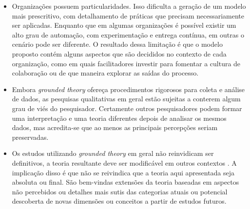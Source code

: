 \begin{itemize}
\item Organizações possuem particularidades. Isso dificulta a geração de um
modelo mais prescritivo, com detalhamento de práticas que precisam
necessariamente ser aplicadas. Enquanto que em algumas organizações é possível
existir um alto grau de automação, com experimentação e entrega contínua, em
outras o cenário pode ser diferente. O resultado dessa limitação é que o modelo
proposto contém alguns aspectos que são decididos no contexto de cada
organização, como em quais facilitadores investir para fomentar a cultura de
colaboração ou de que maneira explorar as saídas do processo.

\item Embora {\it grounded theory} ofereça procedimentos rigorosos para coleta e
análise de dados, as pesquisas qualitativas em geral estão sujeitas a conterem
algum grau de viés do pesquisador. Certamente outros pesquisadores podem formar
uma interpretação e uma teoria diferentes depois de analisar os mesmos dados,
mas acredita-se que ao menos as principais percepções seriam preservadas.

\item Os estudos utilizando {\it grounded theory} em geral não reinvidicam ser
definitivos, a teoria resultante deve ser modificável em outros contextos \cite{hoda2012developing}.
A implicação disso é que não se reivindica que a teoria aqui apresentada seja
absoluta ou final. São bem-vindas extensões da teoria baseadas em aspectos não
percebidos ou detalhes mais sutis das categorias atuais ou potencial descoberta
de novas dimensões ou conceitos a partir de estudos futuros.
\end{itemize}
